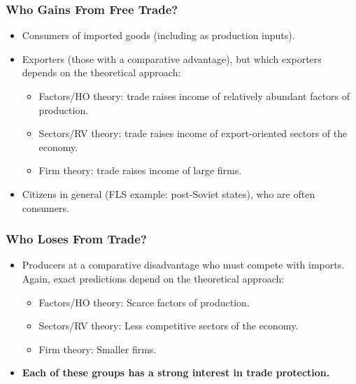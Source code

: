\documentclass[handout]{beamer}
\begin{document}




\begin{frame} 
	\frametitle{\LARGE Who Gains From Free Trade?}
	\begin{itemize}
			\item Consumers of imported goods (including as production inputs). \pause 
			\item Exporters (those with a comparative advantage), but which exporters depends on the theoretical approach: \pause 
			\begin{itemize}
				\item Factors/HO theory: trade raises income of relatively abundant factors of production. \pause 
				\item Sectors/RV theory: trade raises income of export-oriented sectors of the economy. \pause 
				\item Firm theory: trade raises income of large firms. \pause 
			\end{itemize}
			\item Citizens in general (FLS example: post-Soviet states), who are often consumers.
	\end{itemize}
\end{frame}

\begin{frame} 
	\frametitle{\LARGE Who Loses From Trade?}
	\begin{itemize}
			\item Producers at a comparative disadvantage who must compete with imports. Again, exact predictions depend on the theoretical approach: \pause 
			\begin{itemize}
				\item Factors/HO theory: Scarce factors of production. \pause 
				\item Sectors/RV theory: Less competitive sectors of the economy. \pause 
				\item Firm theory: Smaller firms. \pause  
			\end{itemize}
			\item \textbf{Each of these groups has a strong interest in trade protection.}
	\end{itemize}
\end{frame}
\end{document}
